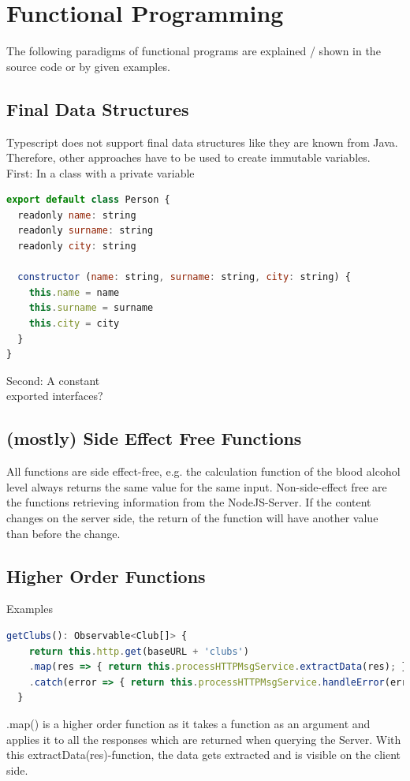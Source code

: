 \documentclass[12pt]{article}
\begin{document}
\section{Functional Programming}

The following paradigms of functional programs are explained / shown in the source code or by given examples.

\subsection{Final Data Structures}

Typescript does not support final data structures like they are known from Java. Therefore, other approaches have to be used to create immutable variables.\\
First: 	In a class with a private variable\\
\begin{lstlisting}[language=javascript]
export default class Person {
  readonly name: string
  readonly surname: string
  readonly city: string
    
  constructor (name: string, surname: string, city: string) {
    this.name = name
    this.surname = surname
    this.city = city
  }
}
\end{lstlisting}
Second:	A constant\\
exported interfaces?
\subsection{(mostly) Side Effect Free Functions}

All functions are side effect-free, e.g. the calculation function of the blood alcohol level always returns the same value for the same input. Non-side-effect free are the functions retrieving information from the NodeJS-Server. If the content changes on the server side, the return of the function will have another value than before the change.

\subsection{Higher Order Functions}

Examples
\begin{lstlisting}[language=javascript]
getClubs(): Observable<Club[]> {
    return this.http.get(baseURL + 'clubs')
    .map(res => { return this.processHTTPMsgService.extractData(res); })
    .catch(error => { return this.processHTTPMsgService.handleError(error); });
  }
\end{lstlisting}
.map() is a higher order function as it takes a function as an argument and applies it to all the responses which are returned when querying the Server. With this extractData(res)-function, the data gets extracted and is visible on the client side.
\end{document}
